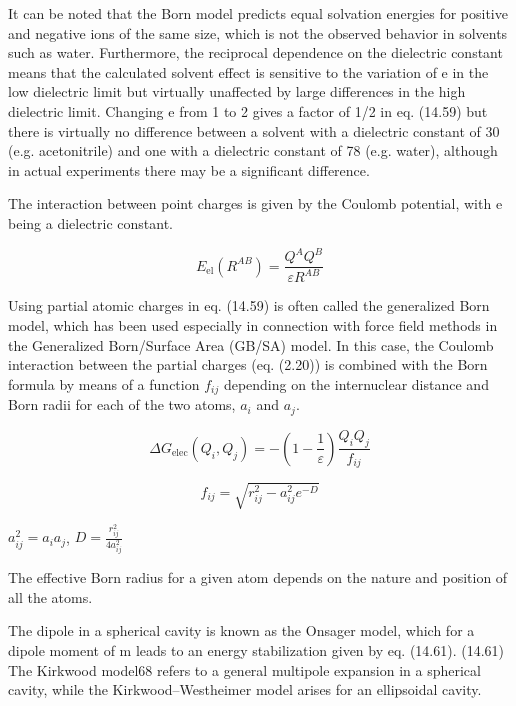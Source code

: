 It can be noted that the Born model predicts equal solvation energies
for positive and negative ions of the same size, which is not the
observed behavior in solvents such as water. Furthermore, the reciprocal
dependence on the dielectric constant means that the calculated solvent
effect is sensitive to the variation of e in the low dielectric limit
but virtually unaffected by large differences in the high dielectric
limit. Changing e from 1 to 2 gives a factor of 1/2 in eq. (14.59)
but there is virtually no difference between a solvent with a dielectric
constant of 30 (e.g. acetonitrile) and one with a dielectric constant
of 78 (e.g. water), although in actual experiments there may be a
significant difference.

The interaction between point charges is given by the Coulomb potential,
with e being a dielectric constant.

\begin{equation}
E_{\mathrm{el}}(R^{AB})=\frac{Q^{A}Q^{B}}{\varepsilon R^{AB}}
\end{equation}


Using partial atomic charges in eq. (14.59) is often called the generalized
Born model, which has been used especially in connection with force
field methods in the Generalized Born/Surface Area (GB/SA) model.
In this case, the Coulomb interaction between the partial charges
(eq. (2.20)) is combined with the Born formula by means of a function
$f_{ij}$ depending on the internuclear distance and Born radii for
each of the two atoms, $a_{i}$ and $a_{j}$.

\begin{equation}
\Delta G_{\mathrm{elec}}(Q_{i},Q_{j})=-\left(1-\frac{1}{\varepsilon}\right)\frac{Q_{i}Q_{j}}{f_{ij}}
\end{equation}


\begin{equation}
f_{ij}=\sqrt{r_{ij}^{2}-a_{ij}^{2}e^{-D}}
\end{equation}


$a_{ij}^{2}=a_{i}a_{j}$, $D=\frac{r_{ij}^{2}}{4a_{ij}^{2}}$

The effective Born radius for a given atom depends on the nature and
position of all the atoms.

The dipole in a spherical cavity is known as the Onsager model, which
for a dipole moment of m leads to an energy stabilization given by
eq. (14.61). (14.61) The Kirkwood model68 refers to a general multipole
expansion in a spherical cavity, while the Kirkwood–Westheimer model
arises for an ellipsoidal cavity.

